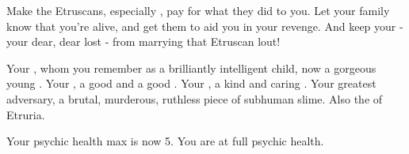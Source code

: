 \documentclass[blue]{Kos}
\begin{document}
Make the Etruscans, especially \cEtruriaKing{}, pay for what they did to you. Let your family know that you're alive, and get them to aid you in your revenge. And keep your \cBride{\sibling} - your dear, dear lost \cBride{\sibling} - from marrying that Etruscan lout!

\begin{contacts}
\contact{\cBride{}} Your \cBride{\sibling}, whom you remember as a brilliantly intelligent child, now a gorgeous young \cBride{\human}.
\contact{\cScythiaKing{}} Your \cScythiaKing{\parent}, a good \cScythiaKing{\human} and a good \cScythiaKing{\monarch}.
\contact{\cScythiaQueen{}} Your \cScythiaQueen{\parent}, a kind and caring \cScythiaQueen{\human}.
\contact{\cEtruriaKing{}} Your greatest adversary, a brutal, murderous, ruthless piece of subhuman slime. Also the \cEtruriaKing{\monarch} of Etruria.
\end{contacts} 

Your psychic health max is now 5. You are at full psychic health.
\end{document}

